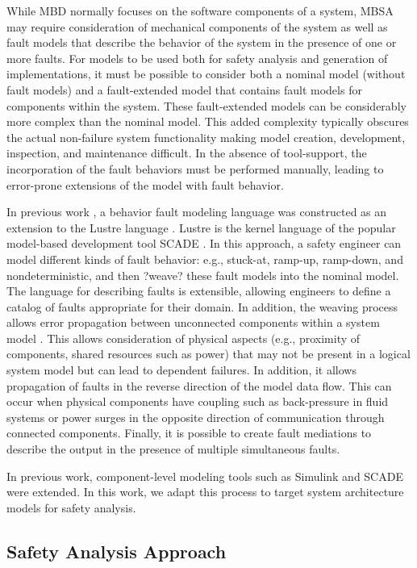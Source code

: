 While MBD normally focuses on the software components of a system, MBSA may require consideration of mechanical components of the system as well as fault models that describe the behavior of the system in the presence of one or more faults. For models to be used both for safety analysis and generation of implementations, it must be possible to consider both a nominal model (without fault models) and a fault-extended model that contains fault models for components within the system. These fault-extended models can be considerably more complex than the nominal model. This added complexity typically obscures the actual non-failure system functionality making model creation, development, inspection, and maintenance difficult. In the absence of tool-support, the incorporation of the fault behaviors must be performed manually, leading to error-prone extensions of the model with fault behavior.

In previous work \cite{Joshi05:SafeComp}, a behavior fault modeling language was constructed as an extension to the Lustre language \cite{Halbwachs91:IEEE}. Lustre is the kernel language of the popular model-based development tool SCADE \cite{SCADE}. In this approach, a safety engineer can model different kinds of fault behavior: e.g., stuck-at, ramp-up, ramp-down, and nondeterministic, and then ?weave? these fault models into the nominal model. The language for describing faults is extensible, allowing engineers to define a catalog of faults appropriate for their domain. In addition, the weaving process allows error propagation between unconnected components within a system model \cite{Joshi07:Hase}. This allows consideration of physical aspects (e.g., proximity of components, shared resources such as power) that may not be present in a logical system model but can lead to dependent failures. In addition, it allows propagation of faults in the reverse direction of the model data flow. This can occur when physical components have coupling such as back-pressure in fluid systems or power surges in the opposite direction of communication through connected components. Finally, it is possible to create fault mediations to describe the output in the presence of multiple simultaneous faults.

In previous work, component-level modeling tools such as Simulink \cite{MathWorks} and SCADE \cite{SCADE} were extended. In this work, we adapt this process to target system architecture models \cite{AADL, SysML} for safety analysis.

\subsection{Safety Analysis Approach}

